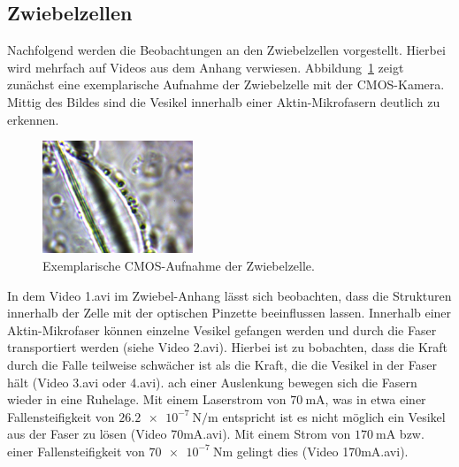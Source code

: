 \subsection{Zwiebelzellen}
Nachfolgend werden die Beobachtungen an den Zwiebelzellen vorgestellt. Hierbei wird mehrfach auf Videos aus dem Anhang
verwiesen. Abbildung~\ref{fig: zwiebelzelle} zeigt zunächst eine exemplarische Aufnahme der Zwiebelzelle mit der CMOS-Kamera.
Mittig des Bildes sind die Vesikel innerhalb einer Aktin-Mikrofasern deutlich zu erkennen.
\begin{figure}
  \centering
  \includegraphics[width = 0.4\textwidth]{../analysis/data/iii_zwiebel/bilder/1.png}
  \caption{Exemplarische CMOS-Aufnahme der Zwiebelzelle.}
  \label{fig: zwiebelzelle}
\end{figure}

In dem Video 1.avi im Zwiebel-Anhang lässt sich beobachten, dass die Strukturen innerhalb der Zelle mit der optischen Pinzette
beeinflussen lassen. Innerhalb einer Aktin-Mikrofaser können einzelne Vesikel gefangen werden und durch die Faser transportiert werden
(siehe Video 2.avi). Hierbei ist zu bobachten, dass die Kraft durch die Falle teilweise schwächer ist als die Kraft, die die
Vesikel in der Faser hält (Video 3.avi oder 4.avi). ach einer Auslenkung bewegen sich die Fasern wieder in eine
Ruhelage. Mit einem Laserstrom von $\SI{70}{\milli\ampere}$, was in etwa einer Fallensteifigkeit von
$\SI{26.2e-7}{\newton\per\meter}$ entspricht ist es nicht möglich ein Vesikel aus der Faser zu lösen (Video 70mA.avi). Mit einem Strom
von $\SI{170}{\milli\ampere}$ bzw. einer Fallensteifigkeit von $\SI{70e-7}{\newton\meter}$ gelingt dies (Video 170mA.avi).

